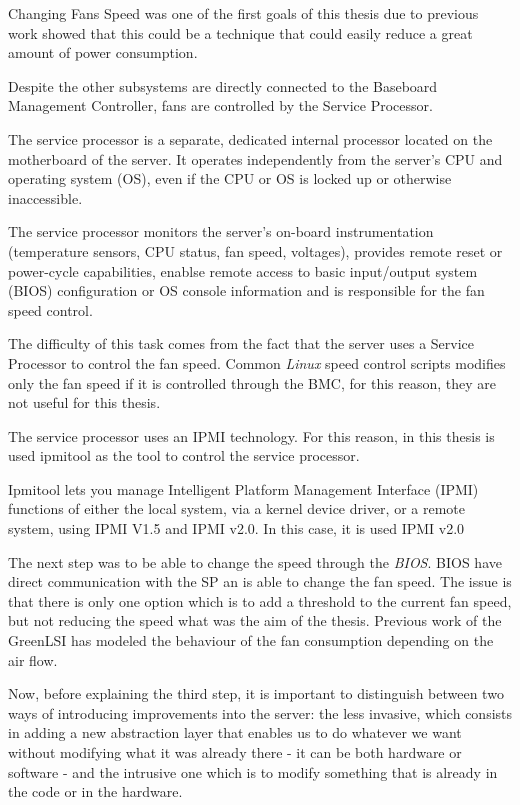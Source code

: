 Changing Fans Speed was one of the first goals of this thesis due to previous work showed that this could be a technique that could easily reduce a great amount of power consumption.

Despite the other subsystems are directly connected to the Baseboard Management Controller, fans are controlled by the Service Processor. \cite{serverSpecif}

The service processor is a separate, dedicated internal processor located on the motherboard of the server. It operates independently from the server’s CPU and operating system (OS), even if the CPU or OS is locked up or otherwise inaccessible.

The service processor monitors the server’s on-board instrumentation (temperature sensors, CPU status, fan speed, voltages), provides remote reset or power-cycle capabilities, enablse remote access to basic input/output system (BIOS) configuration or OS console information and is responsible for the fan speed control.

The difficulty of this task comes from the fact that the server uses a Service Processor to control the fan speed. Common \emph{Linux} speed control scripts modifies only the fan speed if it is controlled through the BMC, for this reason, they are not useful for this thesis.

The service processor uses an IPMI technology. For this reason, in this thesis is used ipmitool as the tool to control the service processor.

Ipmitool lets you manage Intelligent Platform Management Interface (IPMI) \cite{ipmiSpec} functions of either the local system, via a kernel device driver, or a remote system, using IPMI V1.5 and IPMI v2.0. In this case, it is used IPMI v2.0

The next step was to be able to change the speed through the \emph{BIOS}. BIOS have direct communication with the SP an is able to change the fan speed. The issue is that there is only one option which is to add a threshold to the current fan speed, but not reducing the speed what was the aim of the thesis. Previous work of the GreenLSI has modeled the behaviour of the fan consumption depending on the air flow.

Now, before explaining the third step, it is important to distinguish between two ways of introducing improvements into the server: the less invasive, which consists in adding a new abstraction layer that enables us to do whatever we want without modifying what it was already there - it can be both hardware or software - and the intrusive one which is to modify something that is already in the code or in the hardware.

